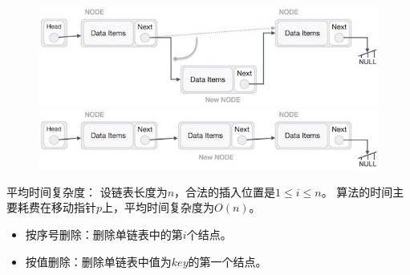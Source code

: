 \begin{frame}
\begin{figure}
\centering
\includegraphics[width=4.5in]{Chapters/Ch02/Fig/linked_list_insertion_2.jpg}\\[0.1cm]\pause 
\includegraphics[width=4.5in]{Chapters/Ch02/Fig/linked_list_insertion_3.jpg}
\end{figure}
\end{frame}

\begin{frame}

\end{frame}

\begin{frame}

\end{frame}
%
%
\begin{frame}

\textcolor{acolor5}{平均时间复杂度：}
设链表长度为$n$，合法的插入位置是$1\le i \le n$。
算法的时间主要耗费在移动指针$p$上，平均时间复杂度为$O(n)$。

\end{frame}
 
 
\begin{frame}
\begin{itemize}
\item 
按序号删除：删除单链表中的第$i$个结点。\\[0.2in]
\item 
按值删除：删除单链表中值为$key$的第一个结点。
\end{itemize}
\end{frame}
 
